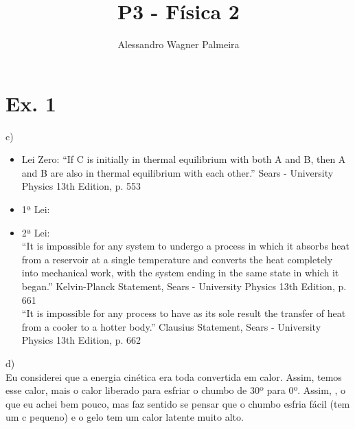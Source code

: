 
\title{P3 - Física 2}
\author{Alessandro Wagner Palmeira}

\maketitle

\section{Ex. 1}
c)
\begin{itemize}
  \item Lei Zero: ``If C is initially in thermal equilibrium with both A and B, then A and B are also
in thermal equilibrium with each other.'' Sears - University Physics 13th Edition, p. 553

  \item 1ª Lei: 
  \item 2ª Lei:\\
``It is impossible for any system to undergo a process in which it absorbs heat
from a reservoir at a single temperature and converts the heat completely into
mechanical work, with the system ending in the same state in which it began.'' Kelvin-Planck Statement, Sears - University Physics 13th Edition, p. 661 \\
``It is impossible for any process to have as its sole result the transfer of heat from
a cooler to a hotter body.'' Clausius Statement, Sears - University Physics 13th Edition, p. 662
\end{itemize}
d) \\
Eu considerei que a energia cinética era toda convertida em calor. Assim, temos esse calor, mais o calor liberado para esfriar o chumbo de 30º para 0º.
Assim, , o que eu achei bem pouco, mas faz sentido se pensar que o chumbo esfria fácil (tem um c pequeno) e o gelo tem um calor latente muito alto.



